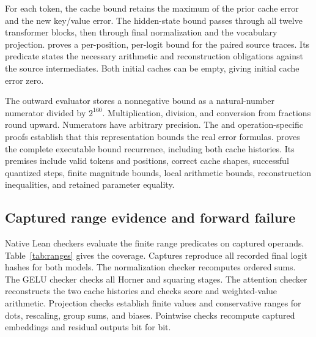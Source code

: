 For each token, the cache bound retains the maximum of the prior cache error and the new key/value error.  The hidden-state bound passes through all twelve transformer blocks, then through final normalization and the vocabulary projection.   proves a per-position, per-logit bound for the paired source traces.  Its  predicate states the necessary arithmetic and reconstruction obligations against the source intermediates.  Both initial caches can be empty, giving initial cache error zero.

The outward evaluator stores a nonnegative bound as a natural-number numerator divided by $2^{160}$.  Multiplication, division, and conversion from fractions round upward.  Numerators have arbitrary precision.  The  and operation-specific proofs establish that this representation bounds the real error formulas.   proves the complete executable bound recurrence, including both cache histories.  Its premises include valid tokens and positions, correct cache shapes, successful quantized steps, finite magnitude bounds, local arithmetic bounds, reconstruction inequalities, and retained parameter equality.

\subsection{Captured range evidence and forward failure}

Native Lean checkers evaluate the finite range predicates on captured operands.  Table~\ref{tab:ranges} gives the coverage.  Captures reproduce all recorded final logit hashes for both models.  The normalization checker recomputes ordered sums.  The GELU checker checks all Horner and squaring stages.  The attention checker reconstructs the two cache histories and checks score and weighted-value arithmetic.  Projection checks establish finite values and conservative ranges for dots, rescaling, group sums, and biases.  Pointwise checks recompute captured embeddings and residual outputs bit for bit.

